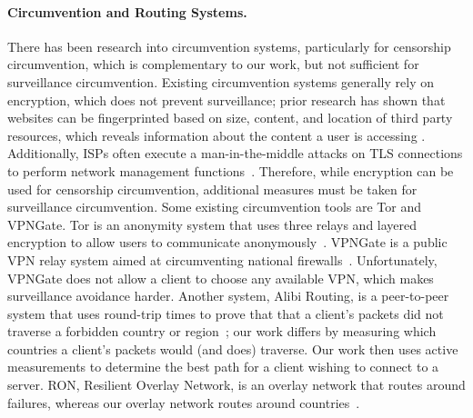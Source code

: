 \paragraph{Circumvention and Routing Systems.}  There has been research into
circumvention systems, particularly for censorship circumvention, which is 
complementary to our work, but not sufficient for surveillance circumvention.  
Existing circumvention systems generally rely on encryption, which does not 
prevent surveillance; prior research has shown that websites can be 
fingerprinted based on size, content, and location of third party resources, which 
reveals information about the content a user is accessing \cite{what_isps_can_see}.  Additionally, 
ISPs often execute a man-in-the-middle attacks on TLS connections to perform 
network management functions~\cite{mitm_isp}.  Therefore, while encryption can be 
used for censorship circumvention, additional measures must be taken for 
surveillance circumvention.  Some existing circumvention tools are Tor and VPNGate.
Tor is an anonymity system that uses three relays and layered encryption
to allow users to communicate anonymously~\cite{dingledine2004tor}.
VPNGate is a public VPN relay system aimed at circumventing national
firewalls~\cite{nobori2014vpn}.  Unfortunately, VPNGate does not allow a
client to choose any available VPN, which makes surveillance avoidance
harder.  Another system, Alibi Routing, is a peer-to-peer system that 
uses round-trip times to prove that that a client's packets did 
not traverse a forbidden country or region~\cite{levin2015alibi}; our work differs by measuring 
which countries a client's packets would (and does) traverse.  Our work then 
uses active measurements to determine the best path for a client wishing 
to connect to a server.  RON, Resilient Overlay Network, is an overlay network that 
routes around failures, whereas our overlay network routes around countries~\cite{andersen2001resilient}.

